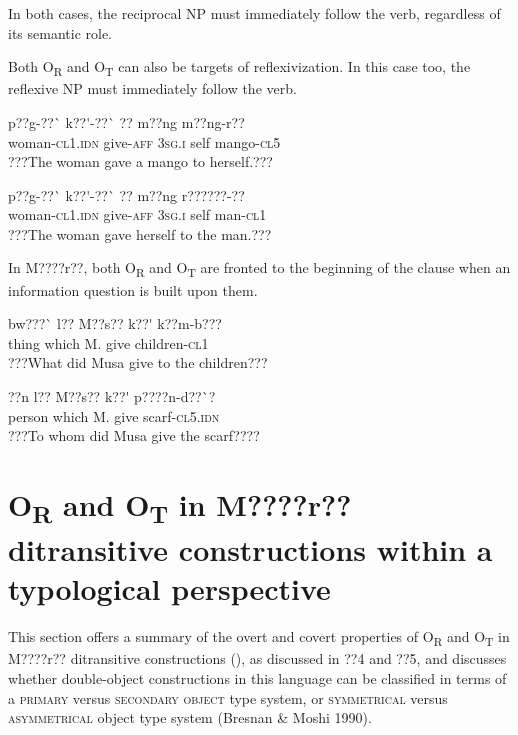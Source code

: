 \documentclass[output=paper]{langsci/langscibook}
\begin{document}
In both cases, the reciprocal NP must immediately follow the verb, regardless of its semantic role. 

Both O\textsubscript{R }and O\textsubscript{T} can also be targets of reflexivization. In this case too, the reflexive NP must immediately follow the verb.


\ea \gll 
p??g-??\`{ }      k??\'{ }-??\`{ }    ??    m??ng  m??ng-r??
\\
%
woman-\textsc{cl1.idn}  give-\textsc{aff}  \textsc{3sg.i  }  self  mango-\textsc{cl5}
\\\glt
???The woman gave a mango to herself.???
\z


\ea \gll 
p??g-??\`{ }      k??\'{ }-??\`{ }        ??    m??ng  r??????-??
\\
%
woman-\textsc{cl1.idn}  give-\textsc{aff}  \textsc{3sg.i  }  self  man-\textsc{cl1}
\\\glt
???The woman gave herself to the man.???
\z


In M????r??, both O\textsubscript{R} and O\textsubscript{T} are fronted to the beginning of the clause when an information question is built upon them. 


\ea \gll 
bw???\`{ }    l??    M??s??  k??\'{ }  k??m-b???
\\
%
thing    which    M.  give  children-\textsc{cl1}
\\\glt
???What did Musa give to the children???
\z


\ea \gll 
??n    l??    M??s??  k??\'{ }  p????n-d??\`{ }?
\\
%
person  which    M.  give  scarf-\textsc{cl5.idn}
\\\glt
???To whom did Musa give the scarf????
\z

\section{O\textsubscript{R} and O\textsubscript{T} in M????r?? ditransitive constructions within a typological perspective}

This section offers a summary of the overt and covert properties of O\textsubscript{R} and O\textsubscript{T} in M????r?? ditransitive constructions (), as discussed in ??4 and ??5, and discusses whether double-object constructions in this language can be classified in terms of a \textsc{primary} versus \textsc{secondary object }\citep{Dryer1986} type system, or \textsc{symmetrical} versus \textsc{asymmetrical} object type system (Bresnan \& Moshi 1990).
\end{document}
